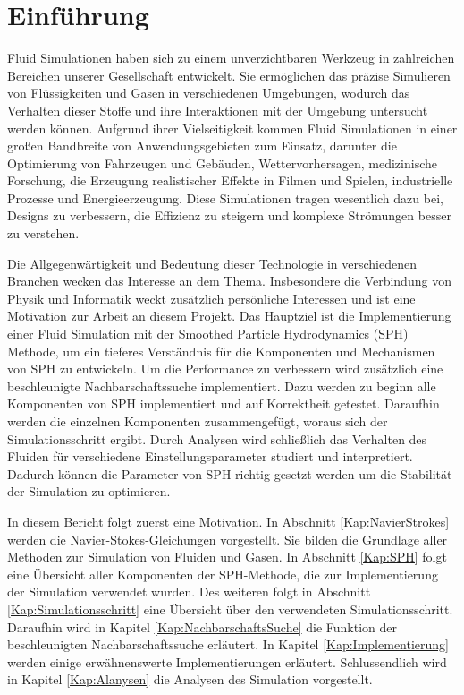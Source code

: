 \documentclass[a4paper, 12pt]{article}
\begin{document}
\makeTitleAndTable
\onehalfspacing

\section{Einführung}
Fluid Simulationen haben sich zu einem unverzichtbaren Werkzeug in zahlreichen Bereichen unserer Gesellschaft entwickelt. Sie ermöglichen das präzise Simulieren von Flüssigkeiten und Gasen in verschiedenen Umgebungen, wodurch das Verhalten dieser Stoffe und ihre Interaktionen mit der Umgebung untersucht werden können. Aufgrund ihrer Vielseitigkeit kommen Fluid Simulationen in einer großen Bandbreite von Anwendungsgebieten zum Einsatz, darunter die Optimierung von Fahrzeugen und Gebäuden, Wettervorhersagen, medizinische Forschung, die Erzeugung realistischer Effekte in Filmen und Spielen, industrielle Prozesse und Energieerzeugung. Diese Simulationen tragen wesentlich dazu bei, Designs zu verbessern, die Effizienz zu steigern und komplexe Strömungen besser zu verstehen.

Die Allgegenwärtigkeit und Bedeutung dieser Technologie in verschiedenen Branchen wecken das Interesse an dem Thema. Insbesondere die Verbindung von Physik und Informatik weckt zusätzlich persönliche Interessen und ist eine Motivation zur Arbeit an diesem Projekt. Das Hauptziel ist die Implementierung einer Fluid Simulation mit der Smoothed Particle Hydrodynamics (SPH) Methode, um ein tieferes Verständnis für die Komponenten und Mechanismen von SPH zu entwickeln. Um die Performance zu verbessern wird zusätzlich eine beschleunigte Nachbarschaftssuche implementiert. 
Dazu werden zu beginn alle Komponenten von SPH implementiert und auf Korrektheit getestet. Daraufhin werden die einzelnen Komponenten zusammengefügt, woraus sich der Simulationsschritt ergibt. Durch Analysen wird schließlich das Verhalten des Fluiden für verschiedene Einstellungsparameter studiert und interpretiert. Dadurch können die Parameter von SPH richtig gesetzt werden um die Stabilität der Simulation zu optimieren.

In diesem Bericht folgt zuerst eine Motivation. In Abschnitt \ref{Kap:NavierStrokes} werden die Navier-Stokes-Gleichungen vorgestellt. Sie bilden die Grundlage aller Methoden zur Simulation von Fluiden und Gasen. In Abschnitt \ref{Kap:SPH} folgt eine Übersicht aller Komponenten der SPH-Methode, die zur Implementierung der Simulation verwendet wurden. Des weiteren folgt in Abschnitt \ref{Kap:Simulationsschritt} eine Übersicht über den verwendeten Simulationsschritt. Daraufhin wird in Kapitel \ref{Kap:NachbarschaftsSuche} die Funktion der beschleunigten Nachbarschaftssuche erläutert. In Kapitel \ref{Kap:Implementierung} werden einige erwähnenswerte Implementierungen erläutert. Schlussendlich wird in Kapitel \ref{Kap:Alanysen} die Analysen des Simulation vorgestellt.
\end{document}
